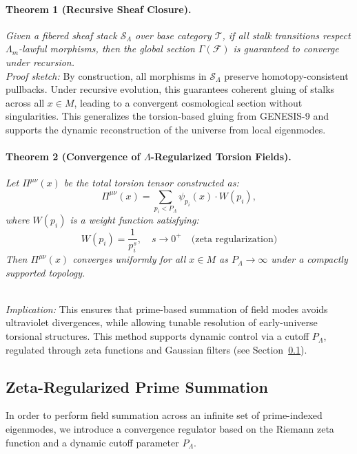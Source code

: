 \documentclass{article}
\theoremstyle{plain}
\begin{document}
\paragraph{Theorem 1 (Recursive Sheaf Closure).}
\textit{Given a fibered sheaf stack $\mathcal{S}_\Lambda$ over base category $\mathcal{T}$, if all stalk transitions respect $\Lambda_m$-lawful morphisms, then the global section $\Gamma(\mathcal{F})$ is guaranteed to converge under recursion.}
\\[0.5em]
\textit{Proof sketch:} By construction, all morphisms in $\mathcal{S}_\Lambda$ preserve homotopy-consistent pullbacks. Under recursive evolution, this guarantees coherent gluing of stalks across all $x \in M$, leading to a convergent cosmological section without singularities. This generalizes the torsion-based gluing from GENESIS-9 \cite{sorensen2025genesis} and supports the dynamic reconstruction of the universe from local eigenmodes.

\paragraph{Theorem 2 (Convergence of $\Lambda$-Regularized Torsion Fields).}
\textit{Let $\Pi^{\mu\nu}(x)$ be the total torsion tensor constructed as:}
\[
\Pi^{\mu\nu}(x) = \sum_{p_i < P_\Lambda} \psi_{p_i}(x) \cdot W(p_i),
\]
\textit{where $W(p_i)$ is a weight function satisfying:}
\[
W(p_i) = \frac{1}{p_i^s}, \quad s \rightarrow 0^+ \quad \text{(zeta regularization)}
\]
\textit{Then $\Pi^{\mu\nu}(x)$ converges uniformly for all $x \in M$ as $P_\Lambda \rightarrow \infty$ under a compactly supported topology.}

\\[0.5em]
\textit{Implication:} This ensures that prime-based summation of field modes avoids ultraviolet divergences, while allowing tunable resolution of early-universe torsional structures. This method supports dynamic control via a cutoff $P_\Lambda$, regulated through zeta functions and Gaussian filters (see Section~\ref{sec:zeta-summation}).

\subsection{Zeta-Regularized Prime Summation}
\label{sec:zeta-summation}

In order to perform field summation across an infinite set of prime-indexed eigenmodes, we introduce a convergence regulator based on the Riemann zeta function and a dynamic cutoff parameter $P_\Lambda$.
\end{document}
